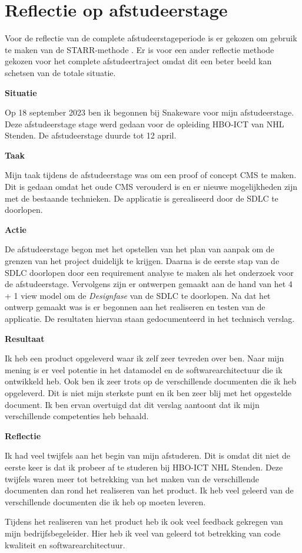 \section{Reflectie op afstudeerstage}
Voor de reflectie van de complete afstudeerstageperiode is er gekozen om gebruik te maken van de STARR-methode \parencite{STARR}.
Er is voor een ander reflectie methode gekozen voor het complete afstudeertraject omdat dit een beter beeld kan schetsen van de totale situatie.

\whitespace
\textbf{Situatie}

\whitespace
Op 18 september 2023 ben ik begonnen bij Snakeware voor mijn afstudeerstage.
Deze afstudeerstage stage werd gedaan voor de opleiding HBO-ICT van NHL Stenden.
De afstudeerstage duurde tot 12 april.

\whitespace
\textbf{Taak}

\whitespace
Mijn taak tijdens de afstudeerstage was om een proof of concept \gls{CMS} te maken.
Dit is gedaan omdat het oude CMS verouderd is en er nieuwe mogelijkheden zijn met de bestaande technieken.
De applicatie is gerealiseerd door de \gls{SDLC} te doorlopen.

\whitespace
\textbf{Actie}

\whitespace
De afstudeerstage begon met het opstellen van het plan van aanpak om de grenzen van het project duidelijk te krijgen.
Daarna is de eerste stap van de \gls{SDLC} doorlopen door een requirement analyse te maken als het onderzoek voor de afstudeerstage.
Vervolgens zijn er ontwerpen gemaakt aan de hand van het 4 + 1 view model om de \textit{Designfase} van de \gls{SDLC} te doorlopen. 
Na dat het ontwerp gemaakt was is er begonnen aan het realiseren en testen van de applicatie.
De resultaten hiervan staan gedocumenteerd in het technisch verslag.

\whitespace
\textbf{Resultaat}

\whitespace
Ik heb een product opgeleverd waar ik zelf zeer tevreden over ben.
Naar mijn mening is er veel potentie in het datamodel en de softwarearchitectuur die ik ontwikkeld heb.
Ook ben ik zeer trots op de verschillende documenten die ik heb opgeleverd.
Dit is niet mijn sterkste punt en ik ben zeer blij met het opgestelde document.
Ik ben ervan overtuigd dat dit verslag aantoont dat ik mijn verschillende competenties heb behaald.

\whitespace
\textbf{Reflectie}

\whitespace
Ik had veel twijfels aan het begin van mijn afstuderen.
Dit is omdat dit niet de eerste keer is dat ik probeer af te studeren bij HBO-ICT NHL Stenden.
Deze twijfels waren meer tot betrekking van het maken van de verschillende documenten dan rond het realiseren van het product.
Ik heb veel geleerd van de verschillende documenten die ik heb op moeten leveren.

\whitespace
Tijdens het realiseren van het product heb ik ook veel feedback gekregen van mijn bedrijfsbegeleider.
Hier heb ik veel van geleerd tot betrekking van code kwaliteit en softwarearchitectuur.
